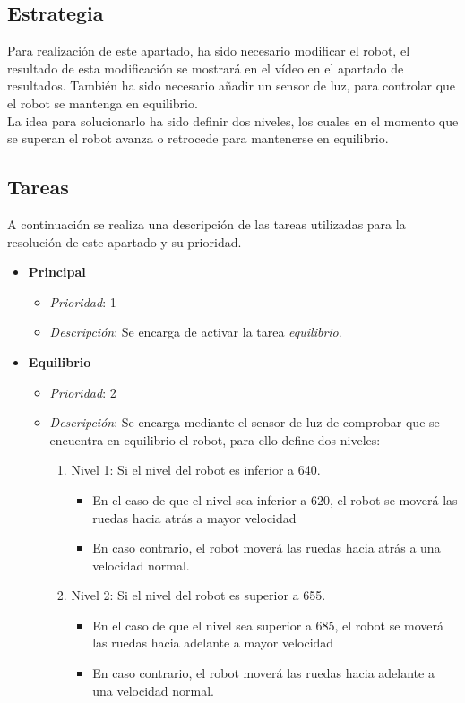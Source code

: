\subsection{Estrategia}
Para realización de este apartado, ha sido necesario modificar el robot, el resultado de esta modificación se mostrará en el vídeo en el apartado de resultados. También ha sido necesario añadir un sensor de luz, para controlar que el robot se mantenga en equilibrio. \\

La idea para solucionarlo ha sido definir dos niveles, los cuales en el momento que se superan el robot avanza o retrocede para mantenerse en equilibrio.
\subsection{Tareas}
A continuación se realiza una descripción de las tareas utilizadas para la resolución de este apartado y su prioridad.

\begin{itemize}
	
	\item \textbf{Principal}
		\begin{itemize}
			\item \textit{Prioridad}: 1
			\item \textit{Descripción}: Se encarga de activar la tarea \textit{equilibrio}.
		\end{itemize}
		
		\item \textbf{Equilibrio}
		\begin{itemize}
			\item \textit{Prioridad}: 2
			\item \textit{Descripción}: Se encarga mediante el sensor de luz de comprobar que se encuentra en equilibrio el robot, para ello define dos niveles:
			\begin{enumerate}
				\item Nivel 1: Si el nivel del robot es inferior a 640.
					\begin{itemize}
						\item En el caso de que el nivel sea inferior a 620, el robot se moverá las ruedas hacia atrás a mayor velocidad
						\item En caso contrario, el robot moverá las ruedas hacia atrás a una velocidad normal.
					\end{itemize}
				\item Nivel 2: Si el nivel del robot es superior a 655.
					\begin{itemize}
						\item En el caso de que el nivel sea superior a 685, el robot se moverá las ruedas hacia adelante a mayor velocidad
						\item En caso contrario, el robot moverá las ruedas hacia adelante a una velocidad normal.
					\end{itemize}
			\end{enumerate}
		\end{itemize}

\end{itemize}

